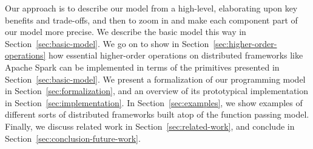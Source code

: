 \documentclass{jfp1}
\begin{document}

Our approach is to describe our model from a high-level, elaborating upon key
benefits and trade-offs, and then to zoom in and make each component part of our
model more precise. We describe the basic model this way in
Section~\ref{sec:basic-model}. We go on to show in
Section~\ref{sec:higher-order-operations} how essential higher-order operations
on distributed frameworks like Apache Spark can be implemented in terms of the
primitives presented in Section~\ref{sec:basic-model}. We present a
formalization of our programming model in Section~\ref{sec:formalization}, and
an overview of its prototypical implementation in
Section~\ref{sec:implementation}. In Section~\ref{sec:examples}, we show
examples of different sorts of distributed frameworks built atop of the function
passing model.
Finally, we discuss related work in Section~\ref{sec:related-work}, and conclude
in Section~\ref{sec:conclusion-future-work}.




\end{document}
